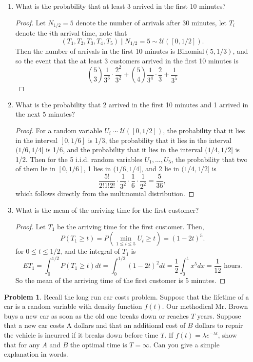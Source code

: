 \documentclass[oneside]{amsart}
\newcommand{\U}{\mathcal{U}}
\newcommand{\Bin}{\mathrm{Binomial}}
\theoremstyle{definition}
\newtheorem{prob}{Problem}
\begin{document}
\begin{enumerate}[label=(\roman*)]
\item
What is the probability that at least 3 arrived in the first 10 minutes?
\begin{proof}
Let $N_{1/2} = 5$ denote the number of arrivals after 30 minutes, let $T_i$ denote the $i$th arrival time, note that 
\[
	(T_1, T_2, T_3, T_4, T_5) \mid N_{1/2} = 5 \sim \U([0, 1/2]).
\]
Then the number of arrivals in the first 10 minutes is $\Bin(5, 1/3)$, and so the event that the at least 3 customers arrived in the first 10 minutes is 
\[
	\binom{5}{3} \frac{1}{3^3} \cdot \frac{2^2}{3^2}
	+ \binom{5}{4} \frac{1}{3^4}  \cdot  \frac{2}{3}
	+  \frac{1}{3^5} 
\]
\end{proof}
\item
What is the probability that 2 arrived in the first 10 minutes and 1 arrived in the next 5 minutes?
\begin{proof}
For a random variable $U_i \sim \U([0,1/2])$, the probability that it lies in the interval $[0,1/6]$ is 1/3, the probability that it lies in the interval $(1/6, 1/4]$ is 1/6, and the probability that it lies in the interval $(1/4, 1/2]$ is 1/2. Then for the 5 i.i.d. random variables $U_1,\dotsc, U_5$, the probability that two of them lie in $[0,1/6]$, 1 lies in $(1/6, 1/4]$, and 2 lie in $(1/4, 1/2]$ is 
\[
	\frac{5!}{2!1!2!} \cdot \frac{1}{3^2}\cdot \frac{1}{6}\cdot\frac{1}{2^2} = \frac{5}{36},
\]
which follows directly from the multinomial distribution. 
\end{proof}
\item
What is the mean of the arriving time for the first customer?
\begin{proof}
Let $T_1$ be the arriving time for the first customer. Then,
\[
	P(T_1 \geq t) = P\left(\min_{1 \leq i \leq 5} U_i\geq t \right) = (1-2t)^5.
\]
for $0 \leq t \leq 1/2$, and the integral of $T_1$ is
\[
	E T_1 = \int_0^{1/2} P(T_1 \geq t) dt 
		= \int_0^{1/2} (1-2t)^2 dt
		= \frac{1}{2} \int_0^1 x^5 dx = \frac{1}{12} \text{ hours}.
\]
So the mean of the arriving time of the first customer is 5 minutes.
\end{proof}

\end{enumerate}

\begin{prob}
Recall the long run car costs problem. Suppose that the lifetime of a car is a random variable with density function $f(t)$. Our methodical Mr. Brown buys a new car as soon as the old one breaks down or reaches $T$ years. Suppose that a new car costs A dollars and that an additional cost of $B$ dollars to repair the vehicle is incurred if it breaks down before time $T$. If $f(t) = \lambda e^{-\lambda t}$, show that for any $A$ and $B$ the optimal time is $T=\infty$. Can you give a simple explanation in words.
\end{prob}
\end{document}
